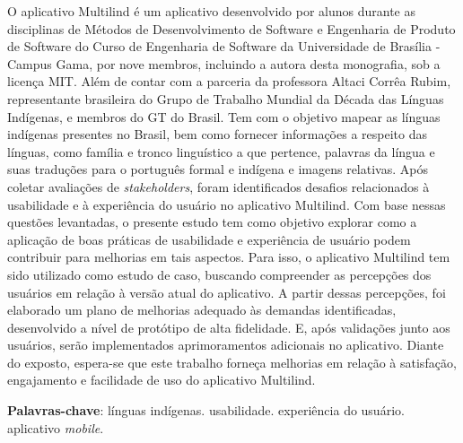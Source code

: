 \begin{resumo}
    O aplicativo Multilind é um aplicativo desenvolvido por alunos durante as disciplinas de Métodos de Desenvolvimento de Software e Engenharia de Produto de Software do
    Curso de Engenharia de Software da Universidade de Brasília - Campus Gama, por nove membros, incluindo a autora desta monografia, sob a licença MIT. Além de contar com a parceria 
    da professora Altaci Corrêa Rubim, representante brasileira do Grupo de Trabalho Mundial da Década das Línguas Indígenas, e membros do GT do Brasil. Tem com o objetivo mapear as línguas indígenas presentes no Brasil, bem como fornecer informações a respeito das línguas, como família e tronco linguístico a que pertence, palavras 
    da língua e suas traduções para o português formal e indígena e imagens relativas. Após coletar avaliações de \textit{stakeholders}, foram identificados desafios relacionados à usabilidade e à experiência do usuário no aplicativo Multilind. Com base 
    nessas questões levantadas, o presente estudo tem como objetivo explorar como a aplicação de boas práticas de usabilidade e experiência de usuário podem contribuir para melhorias 
    em tais aspectos. Para isso, o aplicativo Multilind tem sido utilizado como estudo de caso, buscando compreender as percepções dos usuários em relação à versão atual do aplicativo. A partir dessas 
    percepções, foi elaborado um plano de melhorias adequado às demandas identificadas, desenvolvido a nível de protótipo de alta fidelidade. E, após validações junto aos usuários, serão 
    implementados aprimoramentos adicionais no aplicativo. Diante do exposto, espera-se que este trabalho forneça melhorias em relação à satisfação, engajamento e facilidade de uso do aplicativo Multilind.
    
 \vspace{\onelineskip}
    
 \noindent
 \textbf{Palavras-chave}: línguas indígenas. usabilidade. experiência do usuário. aplicativo \textit{mobile}.
\end{resumo}
